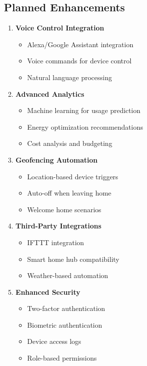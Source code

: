 \documentclass[12pt,a4paper]{article}
\begin{document}
\subsection{Planned Enhancements}

\begin{enumerate}[leftmargin=*]
    \item \textbf{Voice Control Integration}
    \begin{itemize}
        \item Alexa/Google Assistant integration
        \item Voice commands for device control
        \item Natural language processing
    \end{itemize}
    
    \item \textbf{Advanced Analytics}
    \begin{itemize}
        \item Machine learning for usage prediction
        \item Energy optimization recommendations
        \item Cost analysis and budgeting
    \end{itemize}
    
    \item \textbf{Geofencing Automation}
    \begin{itemize}
        \item Location-based device triggers
        \item Auto-off when leaving home
        \item Welcome home scenarios
    \end{itemize}
    
    \item \textbf{Third-Party Integrations}
    \begin{itemize}
        \item IFTTT integration
        \item Smart home hub compatibility
        \item Weather-based automation
    \end{itemize}
    
    \item \textbf{Enhanced Security}
    \begin{itemize}
        \item Two-factor authentication
        \item Biometric authentication
        \item Device access logs
        \item Role-based permissions
    \end{itemize}
\end{enumerate}
\end{document}
